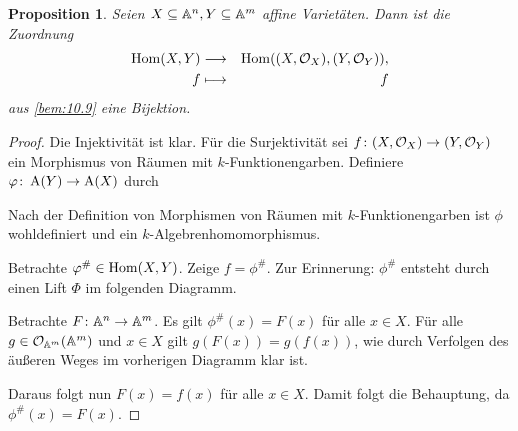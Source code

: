 \documentclass[12pt,a4paper]{scrartcl}
\theoremstyle{cplain}
\newtheorem{prop}[thmcounter]{Proposition}
\theoremstyle{cdef}
\begin{document}
\begin{prop} \label{prop:10.10}
	Seien $X\subseteq\mathbb A^n, Y\subseteq \mathbb A^m$ affine Varietäten. Dann ist die Zuordnung
	\begin{eqnarray*}
		\operatorname{Hom}(X,Y) &\longrightarrow& \operatorname{Hom}((X,\mathcal{O}_X), (Y, \mathcal{O}_Y)), \\
		f &\longmapsto& f
	\end{eqnarray*}
	aus \cref{bem:10.9} eine Bijektion.
\end{prop}
\begin{proof}
	Die Injektivität ist klar. Für die Surjektivität sei $f\colon (X,\mathcal{O}_X)\to (Y,\mathcal{O}_Y)$ ein Morphismus von Räumen mit $k$-Funktionengarben. Definiere $\varphi\colon \operatorname{A}(Y)\to \operatorname{A}(X)$ durch
	\begin{center}
	\end{center}
	Nach der Definition von Morphismen von Räumen mit $k$-Funktionengarben ist $\phi$ wohldefiniert und ein $k$-Algebrenhomomorphismus.
	
	Betrachte $\varphi^{\#}\in \operatorname{Hom}(X,Y)$. Zeige $f = \phi^{\#}$. Zur Erinnerung: $\phi^{\#}$ entsteht durch einen Lift $\Phi$ im folgenden Diagramm.
	\begin{center}
	\end{center}
	Betrachte $F\colon \mathbb A^n\to \mathbb A^m$. Es gilt $\phi^{\#}(x) = F(x)$ für alle $x\in X$. Für alle $g\in \mathcal{O}_{\mathbb A^m}(\mathbb A^m)$ und $x\in X$ gilt $g(F(x)) = g(f(x))$, wie durch Verfolgen des äußeren Weges im vorherigen Diagramm klar ist.
	
	Daraus folgt nun $F(x) = f(x)$ für alle $x\in X$. Damit folgt die Behauptung, da $\phi^{\#}(x) = F(x)$.
	\qedhere
\end{proof}
\end{document}
